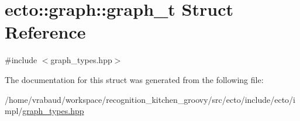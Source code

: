 \hypertarget{structecto_1_1graph_1_1graph__t}{\section{ecto\-:\-:graph\-:\-:graph\-\_\-t \-Struct \-Reference}
\label{structecto_1_1graph_1_1graph__t}
}


{\ttfamily \#include $<$graph\-\_\-types.\-hpp$>$}



\-The documentation for this struct was generated from the following file\-:\begin{DoxyCompactItemize}
\item 
/home/vrabaud/workspace/recognition\-\_\-kitchen\-\_\-groovy/src/ecto/include/ecto/impl/\hyperlink{graph__types_8hpp}{graph\-\_\-types.\-hpp}\end{DoxyCompactItemize}
